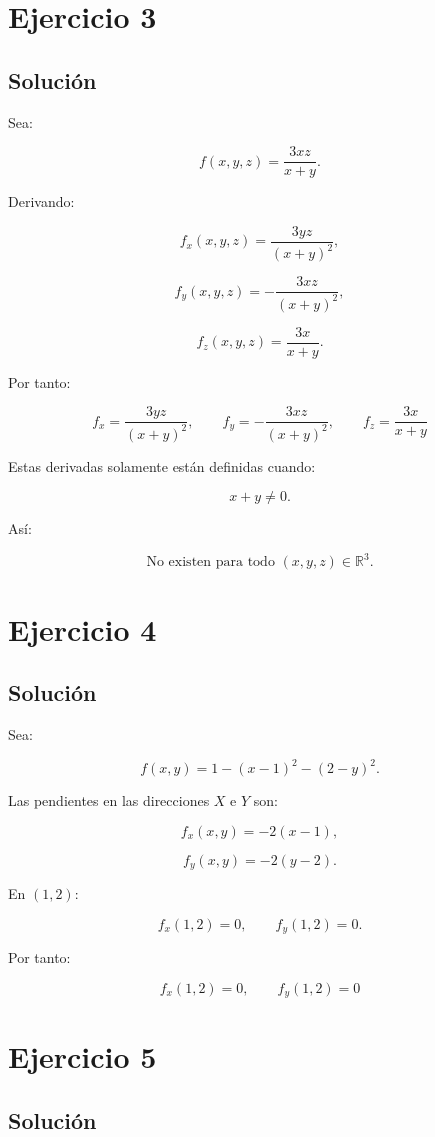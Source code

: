 \documentclass[11pt,a4paper]{article}
\newcommand{\R}{\mathbb{R}}
\begin{document}
\section{Ejercicio 3}
\subsection{Solución}

Sea:

\[
f(x,y,z)
=
\frac{3xz}{x+y}.
\]

Derivando:

\[
f_x(x,y,z)
=
\frac{3yz}{(x+y)^2},
\]

\[
f_y(x,y,z)
=
-\frac{3xz}{(x+y)^2},
\]

\[
f_z(x,y,z)
=
\frac{3x}{x+y}.
\]

Por tanto:

\[
\boxed{
f_x=\frac{3yz}{(x+y)^2},
\qquad
f_y=-\frac{3xz}{(x+y)^2},
\qquad
f_z=\frac{3x}{x+y}
}
\]

Estas derivadas solamente están definidas cuando:

\[
x+y\neq0.
\]

Así:

\[
\boxed{
\text{No existen para todo }(x,y,z)\in\R^3.
}
\]

\section{Ejercicio 4}
\subsection{Solución}

Sea:

\[
f(x,y)
=
1-(x-1)^2-(2-y)^2.
\]

Las pendientes en las direcciones \(X\) e \(Y\) son:

\[
f_x(x,y)
=
-2(x-1),
\]

\[
f_y(x,y)
=
-2(y-2).
\]

En \((1,2)\):

\[
f_x(1,2)=0,
\qquad
f_y(1,2)=0.
\]

Por tanto:

\[
\boxed{
f_x(1,2)=0,
\qquad
f_y(1,2)=0
}
\]

\section{Ejercicio 5}
\subsection{Solución}
\end{document}
